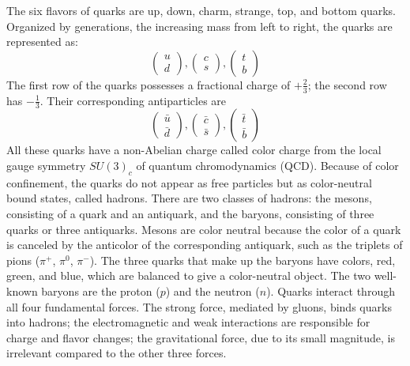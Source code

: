 The six flavors of quarks are up, down, charm, strange, top, and bottom quarks. Organized by generations, the increasing mass from left to right, the quarks are represented as:
\[
\begin{pmatrix} u \\ d \end{pmatrix},
\begin{pmatrix} c \\ s \end{pmatrix},
\begin{pmatrix} t \\ b \end{pmatrix}
\]
The first row of the quarks possesses a fractional charge of $+\frac{2}{3}$; the second row has $-\frac{1}{3}$. Their corresponding antiparticles are
\[
\begin{pmatrix} \bar{u} \\ \bar{d} \end{pmatrix},
\begin{pmatrix} \bar{c} \\ \bar{s} \end{pmatrix},
\begin{pmatrix} \bar{t} \\ \bar{b} \end{pmatrix}
\]
All these quarks have a non-Abelian charge called color charge from the local gauge symmetry $SU(3)_c$ of quantum chromodynamics (QCD). Because of color confinement, the quarks do not appear as free particles but as color-neutral bound states, called hadrons. There are two classes of hadrons: the mesons, consisting of a quark and an antiquark, and the baryons, consisting of three quarks or three antiquarks. Mesons are color neutral because the color of a quark is canceled by the anticolor of the corresponding antiquark, such as the triplets of pions ($\pi^+$, $\pi^0$, $\pi^-$).  The three quarks that make up the baryons have colors, red, green, and blue, which are balanced to give a color-neutral object. The two well-known baryons are the proton ($p$) and the neutron ($n$). Quarks interact through all four fundamental forces. The strong force, mediated by gluons, binds quarks into hadrons; the electromagnetic and weak interactions are responsible for charge and flavor changes; the gravitational force, due to its small magnitude, is irrelevant compared to the other three forces. 

